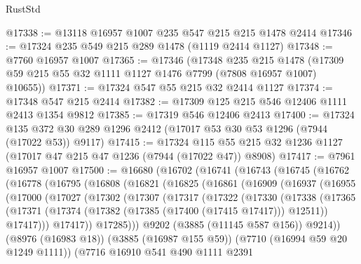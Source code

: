 \begin{lexlean}{RustStd}
\begin{coremodule}
@17338 := @13118 @16957 @1007 @235 @547 @215 @215 @1478 @2414
@17346 := @17324 @235 @549 @215 @289 @1478 (@1119 @2414 @1127)
@17348 := @7760 @16957 @1007
@17365 := @17346
    (@17348
      @235
      @215
      @1478
      (@17309 @59 @215 @55 @32 @1111 @1127 @1476 @7799 (@7808 @16957 @1007) @10655))
@17371 := @17324 @547 @55 @215 @32 @2414 @1127
@17374 := @17348 @547 @215 @2414
@17382 := @17309 @125 @215 @546 @12406 @1111 @2413 @1354 @9812
@17385 := @17319 @546 @12406 @2413
@17400 := @17324
    @135
    @372
    @30
    @289
    @1296
    @2412
    (@17017 @53 @30 @53 @1296 (@7944 (@17022 @53)) @9117)
@17415 := @17324
    @115
    @55
    @215
    @32
    @1236
    @1127
    (@17017 @47 @215 @47 @1236 (@7944 (@17022 @47)) @8908)
@17417 := @7961 @16957 @1007
@17500 := @16680
    (@16702
      (@16741
        (@16743
          (@16745
            (@16762
              (@16778
                (@16795
                  (@16808
                    (@16821
                      (@16825
                        (@16861
                          (@16909
                            (@16937
                              (@16955
                                (@17000
                                  (@17027
                                    (@17302
                                      (@17307
                                        (@17317
                                          (@17322
                                            (@17330
                                              (@17338
                                                (@17365
                                                  (@17371
                                                    (@17374
                                                      (@17382
                                                        (@17385 (@17400 (@17415 @17417)))
                                                        @12511))
                                                    @17417)))
                                              @17417))
                                          @17285)))
                                    @9202
                                    (@3885 (@11145 @587 @156))
                                    @9214))
                                (@8976 (@16983 @18))
                                (@3885 (@16987 @155 @59))
                                (@7710 (@16994 @59 @20 @1249 @1111))
                                (@7716
                                  @16910
                                  @541
                                  @490
                                  @1111
                                  @2391

\end{coremodule}
\end{lexlean}
